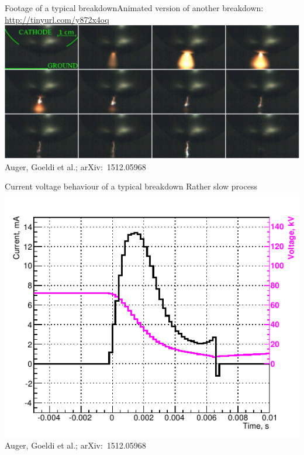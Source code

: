 \documentclass[]{beamer}
\newcommand*{\emphcoltitle}{blue}
\begin{document}
\begin{frame}{Footage of a typical breakdown}{Animated version of another breakdown: \url{http://tinyurl.com/y872x4oq}}
	\centering
	\includegraphics[width=\textwidth]{hv/montage}\\
	{\tiny Auger, Goeldi et al.; arXiv:~1512.05968~\cite{breakdown_16}}
\end{frame}

\begin{frame}{Current voltage behaviour of a typical breakdown}{\color{\emphcoltitle} Rather slow process}
	\centering
	\includegraphics[height=.75\textheight]{hv/IVcorr}\\
	{\tiny Auger, Goeldi et al.; arXiv:~1512.05968~\cite{breakdown_16}}
\end{frame}
\end{document}
